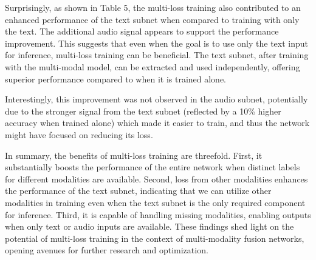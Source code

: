 \documentclass[11pt]{article}
\begin{document}
Surprisingly, as shown in Table 5, the multi-loss training also contributed to an enhanced performance of the text subnet when compared to training with only the text. The additional audio signal appears to support the performance improvement. This suggests that even when the goal is to use only the text input for inference, multi-loss training can be beneficial. The text subnet, after training with the multi-modal model, can be extracted and used independently, offering superior performance compared to when it is trained alone.

Interestingly, this improvement was not observed in the audio subnet, potentially due to the stronger signal from the text subnet (reflected by a 10\% higher accuracy when trained alone) which made it easier to train, and thus the network might have focused on reducing its loss.

In summary, the benefits of multi-loss training are threefold. First, it substantially boosts the performance of the entire network when distinct labels for different modalities are available. Second, loss from other modalities enhances the performance of the text subnet, indicating that we can utilize other modalities in training even when the text subnet is the only required component for inference. Third, it is capable of handling missing modalities, enabling outputs when only text or audio inputs are available. These findings shed light on the potential of multi-loss training in the context of multi-modality fusion networks, opening avenues for further research and optimization.
\end{document}
